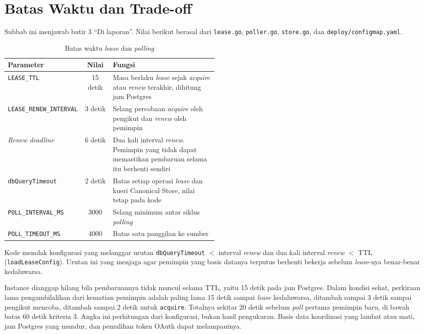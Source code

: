 \section{Batas Waktu dan Trade-off}

Subbab ini menjawab butir 3 ``Di laporan''. Nilai berikut berasal dari \texttt{lease.go}, \texttt{poller.go}, \texttt{store.go}, dan \texttt{deploy/configmap.yaml}.

\begin{table}[H]
\centering
\caption{Batas waktu \textit{lease} dan \textit{polling}}
\begin{tabular}{|l|c|p{0.5\linewidth}|}
\hline
\rowcolor{gray!25}
\textbf{Parameter} & \textbf{Nilai} & \textbf{Fungsi} \\
\hline
\texttt{LEASE\_TTL} & 15 detik & Masa berlaku \textit{lease} sejak \textit{acquire} atau \textit{renew} terakhir, dihitung jam Postgres \\
\hline
\texttt{LEASE\_RENEW\_INTERVAL} & 3 detik & Selang percobaan \textit{acquire} oleh pengikut dan \textit{renew} oleh pemimpin \\
\hline
\textit{Renew deadline} & 6 detik & Dua kali interval \textit{renew}. Pemimpin yang tidak dapat memastikan pembaruan selama itu berhenti sendiri \\
\hline
\texttt{dbQueryTimeout} & 2 detik & Batas setiap operasi \textit{lease} dan kueri Canonical Store, nilai tetap pada kode \\
\hline
\texttt{POLL\_INTERVAL\_MS} & 3000 & Selang minimum antar siklus \textit{polling} \\
\hline
\texttt{POLL\_TIMEOUT\_MS} & 4000 & Batas satu panggilan ke sumber \\
\hline
\end{tabular}
\vspace{-12pt}
\end{table}

Kode menolak konfigurasi yang melanggar urutan \texttt{dbQueryTimeout} $<$ interval \textit{renew} dan dua kali interval \textit{renew} $<$ TTL (\texttt{loadLeaseConfig}). Urutan ini yang menjaga agar pemimpin yang basis datanya terputus berhenti bekerja sebelum \textit{lease}-nya benar-benar kedaluwarsa.

Instance dianggap hilang bila pembaruannya tidak muncul selama TTL, yaitu 15 detik pada jam Postgres. Dalam kondisi sehat, perkiraan lama pengambilalihan dari kematian pemimpin adalah paling lama 15 detik sampai \textit{lease} kedaluwarsa, ditambah sampai 3 detik sampai pengikut mencoba, ditambah sampai 2 detik untuk \texttt{acquire}. Totalnya sekitar 20 detik sebelum \textit{poll} pertama pemimpin baru, di bawah batas 60 detik kriteria 3. Angka ini perhitungan dari konfigurasi, bukan hasil pengukuran. Basis data koordinasi yang lambat atau mati, jam Postgres yang mundur, dan pemulihan token OAuth dapat melampauinya.

